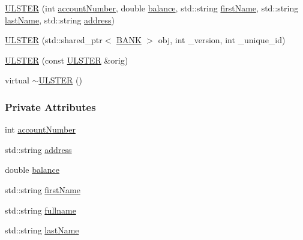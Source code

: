 \begin{DoxyCompactItemize}
\hyperlink{class_u_l_s_t_e_r_ad80944864d4f907dd30b02a1d1a563cc_ad80944864d4f907dd30b02a1d1a563cc}{U\+L\+S\+T\+ER} (int \hyperlink{class_u_l_s_t_e_r_a13f0c2ce30f9e66e896633d81c9af979_a13f0c2ce30f9e66e896633d81c9af979}{account\+Number}, double \hyperlink{class_u_l_s_t_e_r_af98d3ed41f452b28f26994552465815c_af98d3ed41f452b28f26994552465815c}{balance}, std\+::string \hyperlink{class_u_l_s_t_e_r_af8d138fdca14b59130b8b4ddd3d73b16_af8d138fdca14b59130b8b4ddd3d73b16}{first\+Name}, std\+::string \hyperlink{class_u_l_s_t_e_r_afa319e559a6a7653aa67e6d8f801d7ee_afa319e559a6a7653aa67e6d8f801d7ee}{last\+Name}, std\+::string \hyperlink{class_u_l_s_t_e_r_a7a13c5988ddafa47b8d6eea3e77fd786_a7a13c5988ddafa47b8d6eea3e77fd786}{address})
\item 
\hyperlink{class_u_l_s_t_e_r_ac7207ca64f86ef3081e176deb222805d_ac7207ca64f86ef3081e176deb222805d}{U\+L\+S\+T\+ER} (std\+::shared\+\_\+ptr$<$ \hyperlink{class_b_a_n_k}{B\+A\+NK} $>$ obj, int \+\_\+version, int \+\_\+unique\+\_\+id)
\item 
\hyperlink{class_u_l_s_t_e_r_ad8847497742850609cd4748bbb6d0a8e_ad8847497742850609cd4748bbb6d0a8e}{U\+L\+S\+T\+ER} (const \hyperlink{class_u_l_s_t_e_r}{U\+L\+S\+T\+ER} \&orig)
\item 
virtual \hyperlink{class_u_l_s_t_e_r_a4ceb68bdbc806f74f9e55096f8223453_a4ceb68bdbc806f74f9e55096f8223453}{$\sim$\+U\+L\+S\+T\+ER} ()
\end{DoxyCompactItemize}
\subsubsection*{Private Attributes}
\begin{DoxyCompactItemize}
\item 
int \hyperlink{class_u_l_s_t_e_r_a13f0c2ce30f9e66e896633d81c9af979_a13f0c2ce30f9e66e896633d81c9af979}{account\+Number}
\item 
std\+::string \hyperlink{class_u_l_s_t_e_r_a7a13c5988ddafa47b8d6eea3e77fd786_a7a13c5988ddafa47b8d6eea3e77fd786}{address}
\item 
double \hyperlink{class_u_l_s_t_e_r_af98d3ed41f452b28f26994552465815c_af98d3ed41f452b28f26994552465815c}{balance}
\item 
std\+::string \hyperlink{class_u_l_s_t_e_r_af8d138fdca14b59130b8b4ddd3d73b16_af8d138fdca14b59130b8b4ddd3d73b16}{first\+Name}
\item 
std\+::string \hyperlink{class_u_l_s_t_e_r_a5dc42cbd515825463ba31c8d3dcfe1b6_a5dc42cbd515825463ba31c8d3dcfe1b6}{fullname}
\item 
std\+::string \hyperlink{class_u_l_s_t_e_r_afa319e559a6a7653aa67e6d8f801d7ee_afa319e559a6a7653aa67e6d8f801d7ee}{last\+Name}
\end{DoxyCompactItemize}


